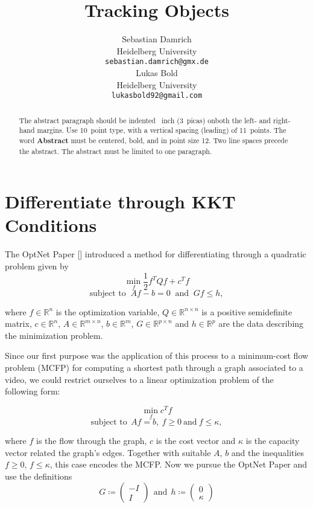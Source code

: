 \documentclass{article}
\title{Tracking Objects}
\author{
	Sebastian Damrich 
    \\
  Heidelberg University\\
  \texttt{sebastian.damrich@gmx.de} \\
   \And
   Lukas Bold  \\
   Heidelberg University \\
  \texttt{lukasbold92@gmail.com} \\
}
\begin{document}

\maketitle

\begin{abstract}
  The abstract paragraph should be indented ~inch
  (3~picas) onboth the left- and right-hand margins. Use 10~point
  type, with a vertical spacing (leading) of 11~points.  The word
  \textbf{Abstract} must be centered, bold, and in point size 12. Two
  line spaces precede the abstract. The abstract must be limited to
  one paragraph.
\end{abstract}

\section{Differentiate through KKT Conditions}
\label{others}

The OptNet Paper [] introduced a method for differentiating through a quadratic problem given by
\[ \min_f \frac{1}{2} f^T Q f + c^T f \]
\[\text{subject to }~  Af-b=0 ~\text{ and }~ Gf \leq h, \]

where $f\in \mathbb{R}^n$ is the optimization variable, $Q\in \mathbb{R}^{n\times n}$ is a positive semidefinite matrix, $c\in \mathbb{R}^n$, $A\in \mathbb{R}^{m\times n}$, $b\in \mathbb{R}^m$, $G\in \mathbb{R}^{p\times n}$ and $h\in \mathbb{R}^p$ are the data describing the minimization problem. 

Since our first purpose was the application of this process to a minimum-cost flow problem (MCFP) for computing a shortest path through a graph associated to a video, we could restrict ourselves to a linear optimization problem of the following form:

\[\min_f c^T f\] 
\[ \text{subject to} ~~Af=b,~f\geq 0 ~\text{and}~ f \leq \kappa,\]

where $f$ is the flow through the graph, $c$ is the cost vector and $\kappa$ is the capacity vector related the graph's edges. Together with suitable $A$, $b$ and the inequalities $f\geq 0$, $f\leq \kappa$, this case encodes the MCFP. Now we pursue the OptNet Paper and use the definitions
\[G\coloneqq \begin{pmatrix} -I \\  I \end{pmatrix} ~~\text{and} ~~ h\coloneqq \begin{pmatrix} 0 \\ \kappa \end{pmatrix} \]
\end{document}
